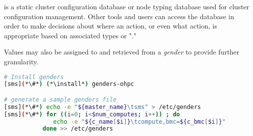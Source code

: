 \genders{} is a static cluster configuration database or node typing database
used for cluster configuration management. Other tools and users can access the
\genders{} database in order to make decisions about where an action, or even
what action, is appropriate based on associated types or "\genders{}."

Values may also be assigned to and retrieved from a {\em gender} to provide
further granularity.

\begin{lstlisting}[language=bash,keywords={},upquote=true]
# Install genders
[sms](*\#*) (*\install*) genders-ohpc

# generate a sample genders file
[sms](*\#*) echo -e "${master_name}\tsms" > /etc/genders
[sms](*\#*) for ((i=0; i<$num_computes; i++)) ; do
              echo -e "${c_name[$i]}\tcompute,bmc=${c_bmc[$i]}"
           done >> /etc/genders
\end{lstlisting}

